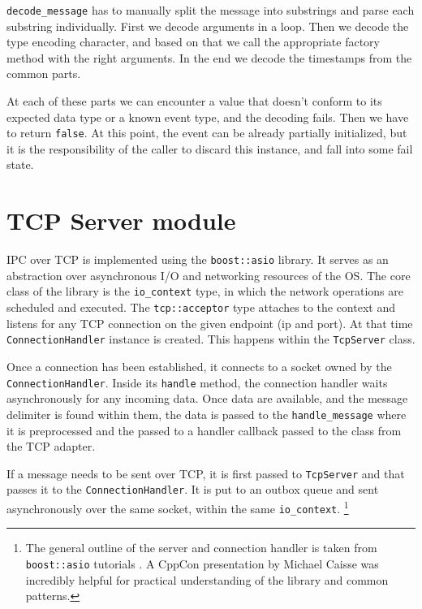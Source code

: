 \texttt{decode\_message} has to manually split the message into substrings and parse each substring individually. First we decode arguments in a loop. Then we decode the type encoding character, and based on that we call the appropriate factory method with the right arguments. In the end we decode the timestamps from the common parts.

At each of these parts we can encounter a value that doesn't conform to its expected data type or a known event type, and the decoding fails. Then we have to return \texttt{false}. At this point, the event can be already partially initialized, but it is the responsibility of the caller to discard this instance, and fall into some fail state.

\section{TCP Server module}

IPC over TCP is implemented using the \texttt{boost::asio} library. It serves as an abstraction over asynchronous I/O and networking resources of the OS. The core class of the library is the \texttt{io\_context} type, in which the network operations are scheduled and executed. The \texttt{tcp::acceptor} type attaches to the context and listens for any TCP connection on the given endpoint (ip and port). At that time \texttt{ConnectionHandler} instance is created. This happens within the \texttt{TcpServer} class.

Once a connection has been established, it connects to a socket owned by the \texttt{ConnectionHandler}. Inside its \texttt{handle} method, the connection handler waits asynchronously for any incoming data. Once data are available, and the message delimiter is found within them, the data is passed to the \texttt{handle\_message} where it is preprocessed and the passed to a handler callback passed to the class from the TCP adapter.

If a message needs to be sent over TCP, it is first passed to \texttt{TcpServer} and that passes it to the \texttt{ConnectionHandler}. It is put to an outbox queue and sent asynchronously over the same socket, within the same \texttt{io\_context}.
\footnote{The general outline of the server and connection handler is taken from \texttt{boost::asio} tutorials \cite{asio_async_server}. A CppCon presentation by Michael Caisse \cite{caisse_asio} was incredibly helpful for practical understanding of the library and common patterns. }

